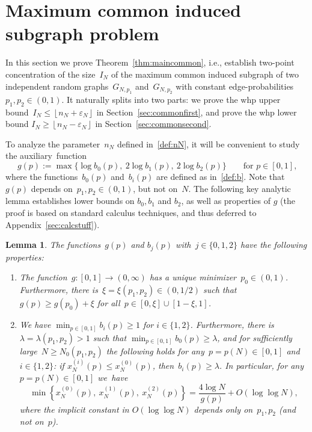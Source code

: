 \documentclass{article}
\newcommand{\eps}{\varepsilon}
\newcommand\floor[1]{\left\lfloor #1 \right \rfloor}
\newcommand{\xone}{x^{(1)}}
\newcommand{\xtwo}{x^{(2)}}
\newcommand{\xot}{x^{(0)}}
\newcommand{\nN}{n_N}
\newtheorem{lemma}[thm]{Lemma}
\newcommand\bigcpar[1]{\bigl\{#1\bigr\}}
\newenvironment{romenumerate}{\vspace{-0.25em}\begin{enumerate}\itemsep0pt \parskip0pt \parsep0pt\renewcommand{\labelenumi}{\textup{(\roman{enumi})}}\renewcommand{\theenumi}{\textup{(\roman{enumi})}}}{\vspace{-0.05em}\end{enumerate}\vspace{-0.05em}}
\begin{document}
\section{Maximum common induced subgraph problem}\label{sec:common}
In this section we prove Theorem~\ref{thm:maincommon}, i.e., establish two-point concentration of the size~$I_N$ of the maximum common induced subgraph of two independent random graphs~$G_{N, p_1}$ and~$G_{N,p_2}$ with constant edge-probabilities~${p_1,p_2 \in (0,1)}$. 
It naturally splits into two parts: 
we prove the whp upper bound~${I_N \le \floor{\nN+\eps_N}}$ in Section~\ref{sec:commonfirst}, 
and prove the whp lower bound ${I_N \ge \floor{\nN-\eps_N}}$ in Section~\ref{sec:commonsecond}. 


To analyze the parameter~$n_N$ defined in~\eqref{def:nN}, it will be convenient to study the auxiliary~function
\begin{equation}\label{deg:gp}
g(p):=\max\bigcpar{\log b_0(p), \: 2\log b_1(p), \: 2\log b_2(p)} \qquad \text{for~$p \in [0,1]$,}
\end{equation}
where the functions~$b_0(p)$ and~$b_i(p)$ are defined as in~\eqref{def:b}. 
Note that~$g(p)$ 
depends on~$p_1,p_2 \in (0,1)$, but not on~$N$. 
The following key analytic lemma establishes lower bounds on $b_0,b_1$ and $b_2$, as well as properties of $g$ (the proof
is based on standard calculus techniques, and thus deferred to Appendix~\ref{sec:calcstuff}).
\begin{lemma}\label{lem:analytic}The functions~$g(p)$ and $b_j(p)$ with~$j \in \{0,1,2\}$ have the following properties:\begin{romenumerate}
    \item\label{item:approximate} The function~$g:[0,1] \to (0,\infty)$ has a unique minimizer~$p_0 \in (0,1)$.
    Furthermore, there is~$\xi=\xi(p_1,p_2) \in (0,1/2)$ such that $g(p)\ge  g(p_0) +\xi$ for all~${p\in [0,\xi]\cup [1-\xi,1]}$.
     \item\label{item:bounded} 
     We have $\min_{p\in [0,1]} b_i(p)\ge 1$ for $i\in \{1,2\}$.
     Furthermore, there is~$\lambda=\lambda(p_1,p_2)>1$ such that $\min_{p\in [0,1]} b_0(p) \ge \lambda$, 
		and for sufficiently large~$N \ge N_0(p_1,p_2)$  the following holds for any~${p=p(N) \in [0,1]}$ and $i\in \{1,2\}$: 
		if $x^{(i)}_N(p)\le x^{(0)}_N(p)$,  then~$b_i(p)\ge \lambda$.
     In particular, for any ${p=p(N)\in [0,1]}$ we~have 
		\begin{equation}\label{eq:firstorderofmin}
        \min\left\{\xot_N(p), \: \xone_N(p), \: \xtwo_N(p) \right\}= \frac{4\log N}{g(p)} + O(\log\log N) ,
\end{equation}
		where the implicit constant in $O(\log\log N)$ depends only on~$p_1,p_2$ (and not on~$p$).
\end{romenumerate}\vspace{-0.125em}\end{lemma}\noindent
\end{document}
